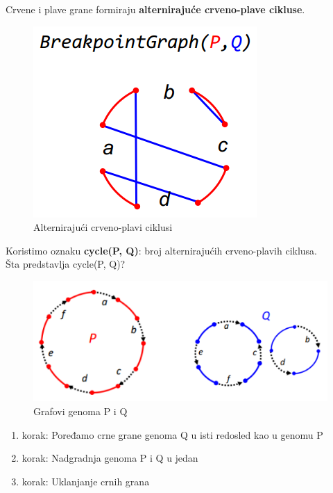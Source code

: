 {\color{red} Crvene} i {\color{blue} plave} grane formiraju \textbf{alternirajuće crveno-plave cikluse}.
\begin{figure}[h!]
\centering
\includegraphics[scale=0.7]{poglavlja/6/slike/alternirajuci.PNG}
\caption{Alternirajući crveno-plavi ciklusi }
\label{slika:X}
\end{figure}

\newpage
\noindent Koristimo oznaku \textbf{cycle(P, Q)}: broj alternirajućih crveno-plavih ciklusa.\\

\noindent Šta predstavlja cycle(P, Q)?
\begin{figure}[h!]
\includegraphics[scale=0.7]{poglavlja/6/slike/PiQ1.PNG}
\caption{Grafovi genoma P i Q}
\label{slika:X}
\end{figure}

\begin{enumerate}
\item {korak: Poređamo crne grane genoma Q u isti redosled kao u genomu P}
\item {korak: Nadgradnja genoma P i Q u jedan}
\item {korak: Uklanjanje crnih grana}
\end{enumerate}

